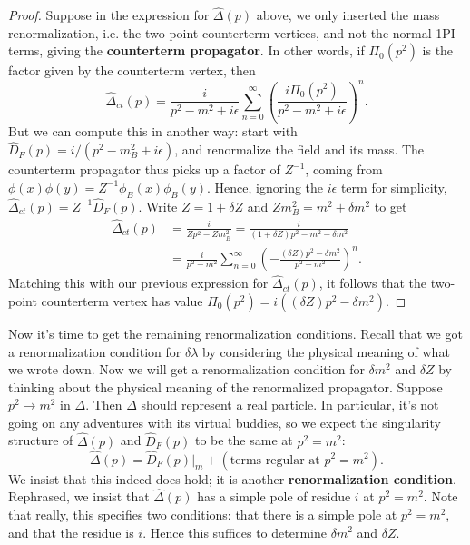 \documentclass{report}
\theoremstyle{plain}
\theoremstyle{definition}
\theoremstyle{remark}
\begin{document}
\begin{proof}
  Suppose in the expression for $\widehat{\Delta}(p)$ above, we only
  inserted the mass renormalization, i.e. the two-point counterterm
  vertices, and not the normal 1PI terms, giving the {\bf counterterm
    propagator}. In other words, if $\Pi_0(p^2)$ is the factor given by
  the counterterm vertex, then
  $$ \widehat{\Delta}_{ct}(p) = \frac{i}{p^2 - m^2 + i\epsilon} \sum_{n=0}^\infty \left(\frac{i \Pi_0(p^2)}{p^2 - m^2 + i\epsilon}\right)^n. $$
  But we can compute this in another way: start with
  $\widehat{D}_F(p) = i/(p^2 - m_B^2 + i\epsilon)$, and renormalize
  the field and its mass. The counterterm propagator thus picks up a
  factor of $Z^{-1}$, coming from
  $\phi(x)\phi(y) = Z^{-1}\phi_B(x)\phi_B(y)$. Hence, ignoring the
  $i\epsilon$ term for simplicity,
  $\widehat{\Delta}_{ct}(p) = Z^{-1}\widehat{D}_F(p)$. Write
  $Z = 1 + \delta Z$ and $Zm_B^2 = m^2 + \delta m^2$ to get
  \begin{align*}
    \widehat{\Delta}_{ct}(p) 
    &= \frac{i}{Zp^2 - Zm_B^2} = \frac{i}{(1 + \delta Z)p^2 - m^2 - \delta m^2} \\
    &= \frac{i}{p^2 - m^2} \sum_{n=0}^\infty \left(-\frac{(\delta Z)p^2 - \delta m^2}{p^2 - m^2}\right)^n.
  \end{align*}
  Matching this with our previous expression for
  $\widehat{\Delta}_{ct}(p)$, it follows that the two-point
  counterterm vertex has value
  $\Pi_0(p^2) = i((\delta Z)p^2 - \delta m^2)$.
\end{proof}

Now it's time to get the remaining renormalization conditions. Recall
that we got a renormalization condition for $\delta \lambda$ by
considering the physical meaning of what we wrote down. Now we will
get a renormalization condition for $\delta m^2$ and $\delta Z$ by
thinking about the physical meaning of the renormalized propagator.
Suppose $p^2 \to m^2$ in $\Delta$. Then $\Delta$ should represent a
real particle. In particular, it's not going on any adventures with
its virtual buddies, so we expect the singularity structure of
$\widehat{\Delta}(p)$ and $\widehat{D}_F(p)$ to be the same at
$p^2 = m^2$:
$$ \widehat{\Delta}(p) = \widehat{D}_F(p)|_m + (\text{terms regular at } p^2 = m^2). $$
We insist that this indeed does hold; it is another {\bf
  renormalization condition}. Rephrased, we insist that
$\widehat{\Delta}(p)$ has a simple pole of residue $i$ at $p^2 = m^2$.
Note that really, this specifies two conditions: that there is a
simple pole at $p^2 = m^2$, and that the residue is $i$. Hence this
suffices to determine $\delta m^2$ and $\delta Z$.
\end{document}

